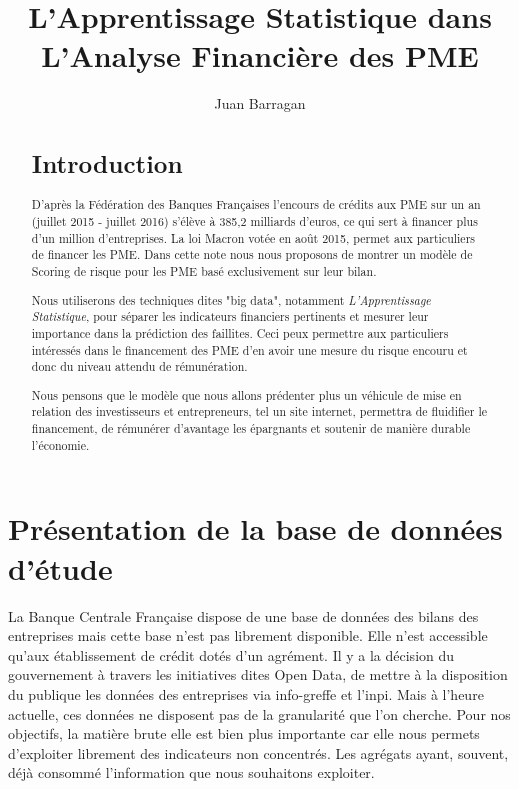 \documentclass[DIV=calc, paper=a4, fontsize=11pt, twocolumn]{scrartcl}
\title{L'Apprentissage Statistique dans L'Analyse Financière des PME}
\author{Juan Barragan}
\date{} %
\begin{document}
\maketitle 
\tableofcontents
\thispagestyle{fancy}
\begin{abstract}
\section{Introduction}
D'après la Fédération des Banques Françaises l'encours de crédits aux PME sur un an (juillet 2015 - juillet 2016) s'élève à 385,2 milliards 
d'euros, ce qui sert à financer plus d'un million d'entreprises. La loi Macron votée en août 2015, permet aux particuliers de financer les PME.
 Dans cette note nous nous proposons de montrer un modèle de Scoring de risque pour les PME basé exclusivement sur leur bilan. 

Nous utiliserons des techniques  dites "big data", notamment \emph{L'Apprentissage Statistique}, pour séparer les indicateurs financiers pertinents et mesurer leur importance dans  la prédiction des faillites. Ceci peux permettre aux particuliers intéressés dans le financement des PME d'en avoir une mesure du risque encouru et donc du niveau attendu de rémunération. 

Nous pensons que le modèle que nous allons prédenter plus un véhicule de mise en relation des investisseurs et entrepreneurs, tel un site internet, permettra de fluidifier le financement, de rémunérer d'avantage les épargnants et soutenir de manière durable l'économie.
\end{abstract}

\section{Présentation de la base de données d'étude}
La Banque Centrale Française dispose de une base de données des bilans des entreprises mais cette base n'est pas librement disponible. Elle n'est accessible qu'aux établissement de crédit dotés d'un agrément. Il y a la décision du gouvernement à travers les initiatives dites Open Data, de mettre à la disposition du publique les données des entreprises via info-greffe et l'inpi. Mais à l'heure actuelle, ces données ne disposent pas de la granularité que l'on cherche. Pour nos objectifs, la matière brute elle est bien plus importante car elle nous permets d'exploiter librement des indicateurs non concentrés. Les agrégats ayant, souvent, déjà consommé l'information que nous souhaitons exploiter.
\end{document}
